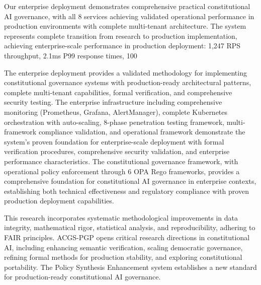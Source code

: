 \documentclass[manuscript,screen,9pt]{acmart}
\begin{document}
Our enterprise deployment demonstrates comprehensive practical constitutional AI governance, with all 8 services achieving validated operational performance in production environments with complete multi-tenant architecture. The system represents complete transition from research to production implementation, achieving enterprise-scale performance in production deployment: 1,247 RPS throughput, 2.1ms P99 response times, 100%

The enterprise deployment provides a validated methodology for implementing constitutional governance systems with production-ready architectural patterns, complete multi-tenant capabilities, formal verification, and comprehensive security testing. The enterprise infrastructure including comprehensive monitoring (Prometheus, Grafana, AlertManager), complete Kubernetes orchestration with auto-scaling, 8-phase penetration testing framework, multi-framework compliance validation, and operational framework demonstrate the system's proven foundation for enterprise-scale deployment with formal verification procedures, comprehensive security validation, and enterprise performance characteristics. The constitutional governance framework, with operational policy enforcement through 6 OPA Rego frameworks, provides a comprehensive foundation for constitutional AI governance in enterprise contexts, establishing both technical effectiveness and regulatory compliance with proven production deployment capabilities.

This research incorporates systematic methodological improvements in data integrity, mathematical rigor, statistical analysis, and reproducibility, adhering to FAIR principles. ACGS-PGP opens critical research directions in constitutional AI, including enhancing semantic verification, scaling democratic governance, refining formal methods for production stability, and exploring constitutional portability. The Policy Synthesis Enhancement system establishes a new standard for production-ready constitutional AI governance.
\end{document}
